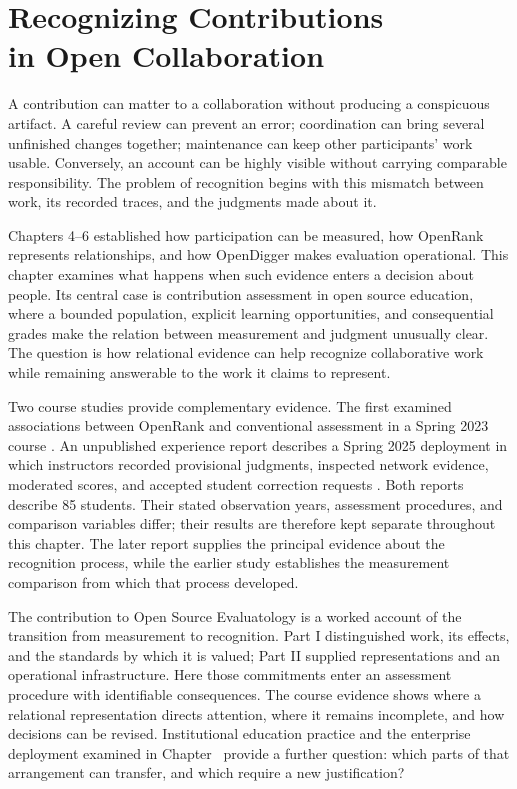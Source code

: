 \chapter[Recognizing Contributions in Open Collaboration]{Recognizing Contributions\\in Open Collaboration}
\label{ch:seven}

A contribution can matter to a collaboration without producing a conspicuous artifact. A careful review can prevent an error; coordination can bring several unfinished changes together; maintenance can keep other participants' work usable. Conversely, an account can be highly visible without carrying comparable responsibility. The problem of recognition begins with this mismatch between work, its recorded traces, and the judgments made about it.

Chapters 4--6 established how participation can be measured, how OpenRank represents relationships, and how OpenDigger makes evaluation operational. This chapter examines what happens when such evidence enters a decision about people. Its central case is contribution assessment in open source education, where a bounded population, explicit learning opportunities, and consequential grades make the relation between measurement and judgment unusually clear. The question is how relational evidence can help recognize collaborative work while remaining answerable to the work it claims to represent.

Two course studies provide complementary evidence. The first examined associations between OpenRank and conventional assessment in a Spring 2023 course \citep{wang2024course}. An unpublished experience report describes a Spring 2025 deployment in which instructors recorded provisional judgments, inspected network evidence, moderated scores, and accepted student correction requests \citep{seetmanuscript}. Both reports describe 85 students. Their stated observation years, assessment procedures, and comparison variables differ; their results are therefore kept separate throughout this chapter. The later report supplies the principal evidence about the recognition process, while the earlier study establishes the measurement comparison from which that process developed.

The contribution to Open Source Evaluatology is a worked account of the transition from measurement to recognition. Part I distinguished work, its effects, and the standards by which it is valued; Part II supplied representations and an operational infrastructure. Here those commitments enter an assessment procedure with identifiable consequences. The course evidence shows where a relational representation directs attention, where it remains incomplete, and how decisions can be revised. Institutional education practice and the enterprise deployment examined in Chapter~ provide a further question: which parts of that arrangement can transfer, and which require a new justification?

